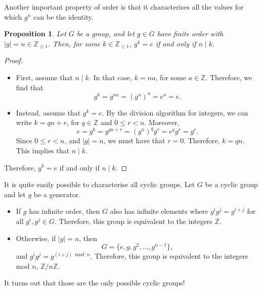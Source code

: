 \documentclass[a4paper, openany]{memoir}
\theoremstyle{definition}
\theoremstyle{plain}
\newtheorem{proposition}[definition]{Proposition}
\begin{document}
\noindent Another important property of order is that it characterises all the values for which $g^n$ can be the identity.
\begin{proposition}
Let $G$ be a group, and let $g \in G$ have finite order with $|g| = n \in \mathbb{Z}_{\geqslant 1}$. Then, for some $k \in \mathbb{Z}_{\geqslant 1}$, $g^k = e$ if and only if $n \mid k$.
\end{proposition}
\begin{proof}
\hspace*{0pt}
\begin{itemize}
    \item First, assume that $n \mid k$. In that case, $k = na$, for some $a \in \mathbb{Z}$. Therefore, we find that
    \[g^k = g^{na} = (g^n)^a = e^a = e.\]
    \item Instead, assume that $g^k = e$. By the division algorithm for integers, we can write $k = qn + r$, for $q \in \mathbb{Z}$ and $0 \leqslant r < n$. Moreover,
    \[e = g^k = g^{qn + r} = (g^n)^q g^r = e^q g^r = g^r.\]
    Since $0 \leqslant r < n$, and $|g| = n$, we must have that $r = 0$. Therefore, $k = qn$. This implies that $n \mid k$.
\end{itemize}
Therefore, $g^k = e$ if and only if $n \mid k$.
\end{proof}

It is quite easily possible to characterise all cyclic groups. Let $G$ be a cyclic group and let $g$ be a generator.
\begin{itemize}
    \item If $g$ has infinite order, then $G$ also has infinite elements where $g^i g^j = g^{i+j}$ for all $g^i, g^j \in G$. Therefore, this group is equivalent to the integers $\mathbb{Z}$.
    \item Otherwise, if $|g| = n$, then 
    \[G = \{e, g, g^2, \dots, g^{n-1}\},\]
    and $g^i g^j = g^{(i+j) \bmod{n}}$. Therefore, this group is equivalent to the integers mod $n$, $\mathbb{Z}/n \mathbb{Z}$.
\end{itemize}
It turns out that those are the only possible cyclic groups!
\end{document}
